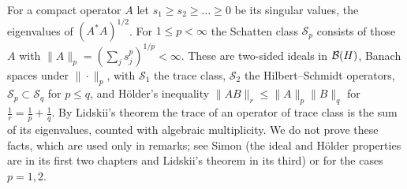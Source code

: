 \begin{remark}\label{hilbert:rem:schatten}
For a compact operator $A$ let $s_1\ge s_2\ge\dots\ge0$ be its singular values, the eigenvalues
of $(A^*A)^{1/2}$. For $1\le p<\infty$ the Schatten class $\mathcal S_p$ consists of those $A$ with
$\|A\|_p=(\sum_js_j^p)^{1/p}<\infty$. These are two-sided ideals in $\mathcal{B}(H)$, Banach spaces under
$\|\cdot\|_p$, with $\mathcal S_1$ the trace class, $\mathcal S_2$ the Hilbert--Schmidt operators,
$\mathcal S_p\subset\mathcal S_q$ for $p\le q$, and H\"older's inequality
$\|AB\|_r\le\|A\|_p\|B\|_q$ for $\frac1r=\frac1p+\frac1q$. By Lidskii's theorem the trace of an operator
of trace class is the sum of its eigenvalues, counted with algebraic multiplicity. We do not prove
these facts, which are used only in remarks; see Simon \cite{Simon-trace} (the ideal and H\"older
properties are in its first two chapters and Lidskii's theorem in its third) or
\cite[Section~VI.6]{Reed-Simon-I} for the cases $p=1,2$.
\end{remark}
